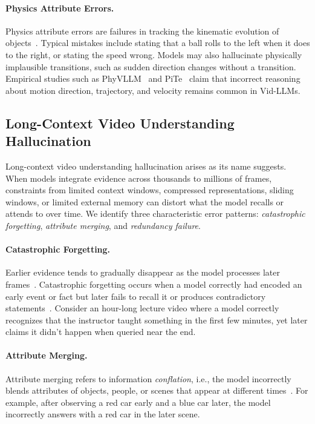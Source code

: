 \documentclass[10pt]{article} %
\begin{document}
\paragraph{Physics Attribute Errors.}
Physics attribute errors are failures in tracking the kinematic evolution of objects~\citep{wu2025st}. Typical mistakes include stating that a ball rolls to the left when it does to the right, or stating the speed wrong. %
Models may also hallucinate physically implausible transitions, such as sudden direction changes without a transition.
Empirical studies such as PhyVLLM~\citep{zhan2025phyvllm} and PiTe~\citep{liu2024pite} claim that incorrect reasoning about motion direction, trajectory, and velocity remains common in Vid-LLMs.

\subsection{Long-Context Video Understanding Hallucination}\label{subsec:long-context-hallucination}

Long-context video understanding hallucination arises as its name suggests. %
When models integrate evidence across thousands to millions of frames, constraints from limited context windows, compressed representations, sliding windows, or limited external memory can distort what the model recalls or attends to over time. We identify three characteristic error patterns: \emph{catastrophic forgetting}, \emph{attribute merging}, and \emph{redundancy failure}.

\paragraph{Catastrophic Forgetting.}
Earlier evidence tends to gradually disappear as the model processes later frames~\citep{xiong2025streaming, wang2024videollamb}. Catastrophic forgetting occurs when a model correctly had encoded an early event or fact but later fails to recall it or produces contradictory statements~\citep{jin2025videomem, yang2025streammem, li2024videochat, yuan2025memory}. Consider an hour-long lecture video where a model correctly recognizes that the instructor taught something in the first few minutes, yet later claims it didn't happen when queried near the end.

\paragraph{Attribute Merging.}
Attribute merging refers to information \emph{conflation}, i.e., the model incorrectly blends attributes of objects, people, or scenes that appear at different times~\citep{lu2025elv}. For example, after observing a red car early and a blue car later, the model incorrectly answers with a red car in the later scene.
\end{document}
